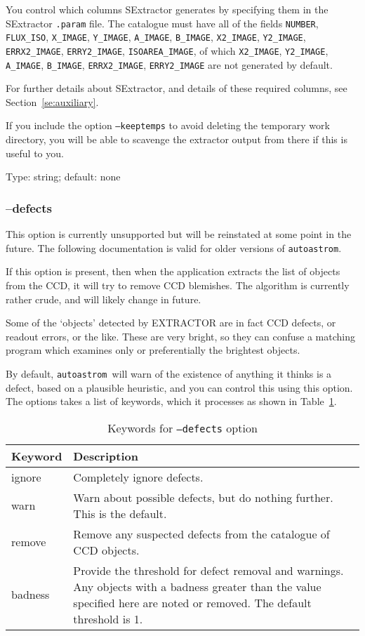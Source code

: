 \documentclass[twoside,11pt,nolof]{starlink}
\providecommand{\autoastrom}{\texttt{autoastrom}}
\begin{document}
You control which columns SExtractor generates by specifying them in the
SExtractor \texttt{.param} file.  The catalogue must have all of the fields
\texttt{NUMBER}, \texttt{FLUX\_ISO}, \texttt{X\_IMAGE}, \texttt{Y\_IMAGE},
\texttt{A\_IMAGE}, \texttt{B\_IMAGE}, \texttt{X2\_IMAGE}, \texttt{Y2\_IMAGE},
\texttt{ERRX2\_IMAGE}, \texttt{ERRY2\_IMAGE}, \texttt{ISOAREA\_IMAGE}, of which
\texttt{X2\_IMAGE}, \texttt{Y2\_IMAGE}, \texttt{A\_IMAGE}, \texttt{B\_IMAGE},
\texttt{ERRX2\_IMAGE}, \texttt{ERRY2\_IMAGE} are not generated by default.

For further details about SExtractor, and details of these required columns,
see Section~\ref{se:auxiliary}.

If you include the option \texttt{--keeptemps} to avoid deleting the
temporary work directory, you will be able to scavenge the extractor output
from there if this is useful to you.

Type: string; default: none

\subsubsection{--defects\label{sb:options:defects}}

This option is currently unsupported but will be reinstated at some point in
the future. The following documentation is valid for older versions of
\autoastrom.

If this option is present, then when the application extracts the list of
objects from the CCD, it will try to remove CCD blemishes.  The algorithm is
currently rather crude, and will likely change in future.

Some of the `objects' detected by EXTRACTOR are in fact CCD defects, or
readout errors, or the like.  These are very bright, so they can confuse a
matching program which examines only or preferentially the brightest objects.

By default, \autoastrom\ will warn of the existence of anything it thinks is a
defect, based on a plausible heuristic, and you can control this using this
option.  The options takes a list of keywords, which it processes as shown in
Table~\ref{tab:defects}.

\begin{table}
\begin{center}
\begin{tabular}{l|p{10cm}}
Keyword & Description \\ \hline
ignore & Completely ignore defects. \\
warn & Warn about possible defects, but do nothing further. This is the
default. \\
remove & Remove any suspected defects from the catalogue of CCD objects. \\
badness & Provide the threshold for defect removal and warnings. Any objects
with a badness greater than the value specified here are noted or removed. The
default threshold is 1.
\end{tabular}
\end{center}
\caption{\label{tab:defects}Keywords for \texttt{--defects} option}
\end{table}
\end{document}
